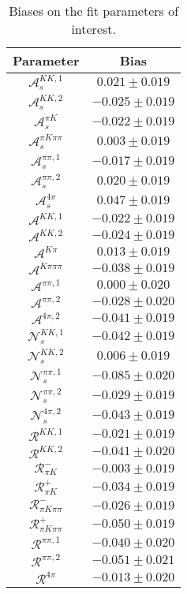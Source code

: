 \begin{table}
  \centering
  \begin{tabular}{cc}
  \toprule
      Parameter & Bias \\
  \midrule
      $\mathcal{A}_s^{KK,1}$ & $0.021 \pm 0.019$ \\
      $\mathcal{A}_s^{KK,2}$ & $-0.025 \pm 0.019$ \\
      $\mathcal{A}_s^{\pi K}$ & $-0.022 \pm 0.019$ \\
      $\mathcal{A}_s^{\pi K\pi\pi}$ & $0.003 \pm 0.019$ \\
      $\mathcal{A}_s^{\pi\pi,1}$ & $-0.017 \pm 0.019$ \\
      $\mathcal{A}_s^{\pi\pi,2}$ & $0.020 \pm 0.019$ \\
      $\mathcal{A}_s^{4\pi}$ & $0.047 \pm 0.019$ \\
      $\mathcal{A}^{KK,1}$ & $-0.022 \pm 0.019$ \\
      $\mathcal{A}^{KK,2}$ & $-0.024 \pm 0.019$ \\
      $\mathcal{A}^{K\pi}$ & $0.013 \pm 0.019$ \\
      $\mathcal{A}^{K\pi\pi\pi}$ & $-0.038 \pm 0.019$ \\
      $\mathcal{A}^{\pi\pi,1}$ & $0.000 \pm 0.020$ \\
      $\mathcal{A}^{\pi\pi,2}$ & $-0.028 \pm 0.020$ \\
      $\mathcal{A}^{4\pi,2}$ & $-0.041 \pm 0.019$ \\
      $\mathcal{N}_s^{KK,1}$ & $-0.042 \pm 0.019$ \\
      $\mathcal{N}_s^{KK,2}$ & $0.006 \pm 0.019$ \\
      $\mathcal{N}_s^{\pi\pi,1}$ & $-0.085 \pm 0.020$ \\
      $\mathcal{N}_s^{\pi\pi,2}$ & $-0.029 \pm 0.019$ \\
      $\mathcal{N}_s^{4\pi,2}$ & $-0.043 \pm 0.019$ \\
      $\mathcal{R}^{KK,1}$ & $-0.021 \pm 0.019$ \\
      $\mathcal{R}^{KK,2}$ & $-0.041 \pm 0.020$ \\
      $\mathcal{R}_{\pi K}^-$ & $-0.003 \pm 0.019$ \\
      $\mathcal{R}_{\pi K}^+$ & $-0.034 \pm 0.019$ \\
      $\mathcal{R}_{\pi K\pi\pi}^-$ & $-0.026 \pm 0.019$ \\
      $\mathcal{R}_{\pi K\pi\pi}^+$ & $-0.050 \pm 0.019$ \\
      $\mathcal{R}^{\pi\pi,1}$ & $-0.040 \pm 0.020$ \\
      $\mathcal{R}^{\pi\pi,2}$ & $-0.051 \pm 0.021$ \\
      $\mathcal{R}^{4\pi}$ & $-0.013 \pm 0.020$ \\
      \bottomrule
  \end{tabular}
  \caption{Biases on the fit parameters of interest.}
\label{tab:biases}
\end{table}
